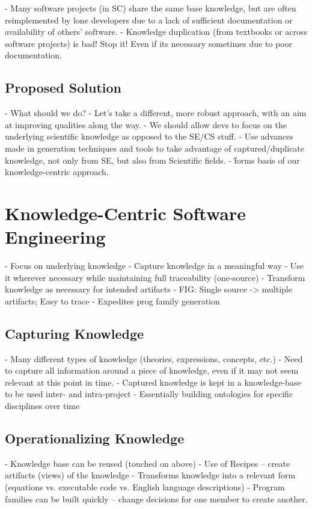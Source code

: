 \documentclass{llncs}
\begin{document}
- Many software projects (in SC) share the same base knowledge, but are often 
    reimplemented by lone developers due to a lack of sufficient documentation or 
    availability of others' software.
- Knowledge duplication (from textbooks or across software projects) is bad! Stop it! Even if its necessary sometimes due to poor documentation.
    
\subsection{Proposed Solution}

- What should we do?  
  - Let's take a different, more robust approach, with an aim at improving qualities along the way.
  - We should allow devs to focus on the underlying scientific knowledge as opposed 
    to the SE/CS stuff.
  - Use advances made in generation techniques and tools to take advantage
    of captured/duplicate knowledge, not only from SE, but also from Scientific fields.
  - \^ forms basis of our knowledge-centric approach.

\section{Knowledge-Centric Software Engineering}
 - Focus on underlying knowledge
 - Capture knowledge in a meaningful way
 - Use it wherever necessary while maintaining full traceability (one-source)
  - Transform knowledge as necessary for intended artifacts
  - FIG: Single source -> multiple artifacts; Easy to trace
 - Expedites prog family generation
 
\subsection{Capturing Knowledge}
 - Many different types of knowledge (theories, expressions, concepts, etc.)
 - Need to capture all information around a piece of knowledge, even if it may
    not seem relevant at this point in time.
 - Captured knowledge is kept in a knowledge-base to be used inter- and intra-project
 - Essentially building ontologies for specific disciplines over time
 
\subsection{Operationalizing Knowledge}
 - Knowledge base can be reused (touched on above)
 - Use of Recipes -- create artifacts (views) of the knowledge
  - Transforms knowledge into a relevant form (equations vs. executable code vs.
    English language descriptions)
  - Program families can be built quickly -- change decisions for one member to 
    create another.
\end{document}
